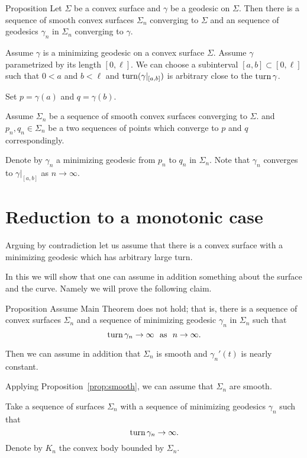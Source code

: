 \documentclass[a4paper,10pt]{amsart}
\begin{document}
\begin{thm}{Proposition}\label{prop:smooth}
Let $\Sigma$ be a convex surface and $\gamma$ be a geodesic on $\Sigma$.
Then there is a sequence of smooth convex surfaces $\Sigma_n$ converging to $\Sigma$
and an sequence of geodesics $\gamma_n$ in $\Sigma_n$ converging to $\gamma$.
\end{thm}

Assume $\gamma$ is a minimizing geodesic on a convex surface $\Sigma$.
Assume $\gamma$ parametrized by its length $[0,\ell]$.
We can choose a subinterval $[a,b]\subset [0,\ell]$
such that $0<a$ and $b<\ell$
and $\mathop{\rm turn}\nolimits(\gamma|_{[a,b]})$ is arbitrary close to the $\mathop{\rm turn}\nolimits \gamma$.

Set $p=\gamma(a)$ and $q=\gamma(b)$.

Assume $\Sigma_n$ be a sequence of smooth convex surfaces converging to $\Sigma$.
and $p_n,q_n\in\Sigma_n$ be a two sequences of points which converge to $p$ and $q$ 
correspondingly.

Denote by $\gamma_n$ a minimizing geodesic from $p_n$ to $q_n$ in $\Sigma_n$.
Note that $\gamma_n$ converges to $\gamma|_{[a,b]}$
as $n\to\infty$.
\qeds


\section{Reduction to a monotonic case}

Arguing by contradiction 
let us assume that 
there is a convex surface with a minimizing geodesic which has arbitrary large turn.

In this we will show that one can assume in addition something about the surface and the curve.
Namely we will prove the following claim.

\begin{thm}{Proposition}\label{prop:almost-const}
Assume Main Theorem does not hold;
that is, there is a sequence of convex surfaces $\Sigma_n$
and a sequence of minimizing geodesic $\gamma_n$ in $\Sigma_n$ such that 
\[\turn \gamma_n\to\infty\ \ \text{as}\ \ n\to\infty.\]

Then we can assume in addition that $\Sigma_n$ is smooth and $\gamma_n'(t)$ is nearly constant.
\end{thm}

Applying Proposition~\ref{prop:smooth}, we can assume that $\Sigma_n$ are smooth.


Take a sequence of surfaces $\Sigma_n$ with a sequence of minimizing geodesics $\gamma_n$ such that 
\[\mathop{\rm turn}\nolimits\gamma_n\to \infty.\]
Denote by $K_n$ the convex body bounded by $\Sigma_n$.
\end{document}
